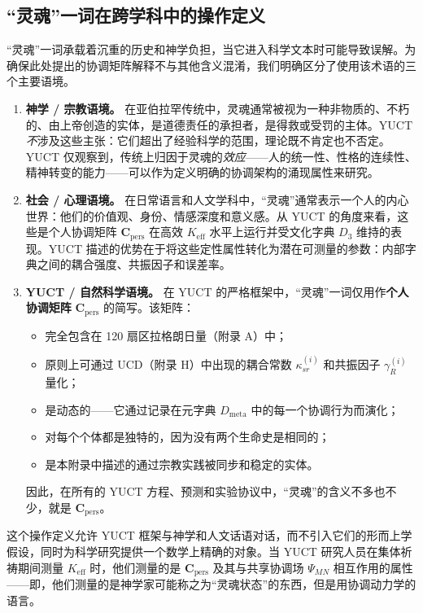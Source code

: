 \documentclass[12pt,a4paper]{article}
\begin{document}
	\subsection{“灵魂”一词在跨学科中的操作定义}
	\label{subsec:soul-definition}
	
	“灵魂”一词承载着沉重的历史和神学负担，当它进入科学文本时可能导致误解。为确保此处提出的协调矩阵解释不与其他含义混淆，我们明确区分了使用该术语的三个主要语境。
	
	\begin{enumerate}[leftmargin=*]
		\item \textbf{神学 / 宗教语境。}
		在亚伯拉罕传统中，灵魂通常被视为一种非物质的、不朽的、由上帝创造的实体，是道德责任的承担者，是得救或受罚的主体。YUCT \emph{不}涉及这些主张：它们超出了经验科学的范围，理论既不肯定也不否定。YUCT 仅观察到，传统上归因于灵魂的\emph{效应}——人的统一性、性格的连续性、精神转变的能力——可以作为定义明确的协调架构的涌现属性来研究。
		
		\item \textbf{社会 / 心理语境。}
		在日常语言和人文学科中，“灵魂”通常表示一个人的内心世界：他们的价值观、身份、情感深度和意义感。从 YUCT 的角度来看，这些是个人协调矩阵 \(\mathbf{C}_{\text{pers}}\) 在高效 \(K_{\mathrm{eff}}\) 水平上运行并受文化字典 \(D_3\) 维持的表现。YUCT 描述的优势在于将这些定性属性转化为潜在可测量的参数：内部字典之间的耦合强度、共振因子和误差率。
		
		\item \textbf{YUCT / 自然科学语境。}
		在 YUCT 的严格框架中，“灵魂”一词仅用作\textbf{个人协调矩阵} \(\mathbf{C}_{\text{pers}}\) 的简写。该矩阵：
		\begin{itemize}
			\item 完全包含在 120 扇区拉格朗日量（附录 A）中；
			\item 原则上可通过 UCD（附录 H）中出现的耦合常数 \(\kappa_{sr}^{(i)}\) 和共振因子 \(\gamma_R^{(i)}\) 量化；
			\item 是动态的——它通过记录在元字典 \(D_{\text{meta}}\) 中的每一个协调行为而演化；
			\item 对每个个体都是独特的，因为没有两个生命史是相同的；
			\item 是本附录中描述的通过宗教实践被同步和稳定的实体。
		\end{itemize}
		因此，在所有的 YUCT 方程、预测和实验协议中，“灵魂”的含义不多也不少，就是 \(\mathbf{C}_{\text{pers}}\)。
	\end{enumerate}
	
	这个操作定义允许 YUCT 框架与神学和人文话语对话，而不引入它们的形而上学假设，同时为科学研究提供一个数学上精确的对象。当 YUCT 研究人员在集体祈祷期间测量 \(K_{\mathrm{eff}}\) 时，他们测量的是 \(\mathbf{C}_{\text{pers}}\) 及其与共享协调场 \(\Psi_{MN}\) 相互作用的属性——即，他们测量的是神学家可能称之为“灵魂状态”的东西，但是用协调动力学的语言。
	
\end{document}
